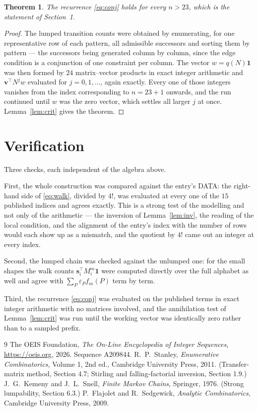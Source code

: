 \documentclass[11pt,a4paper]{article}
\theoremstyle{plain}
\newtheorem{theorem}{Theorem}
\theoremstyle{definition}
\begin{document}
\begin{theorem}
The recurrence \eqref{eq:conj} holds for every $n>23$, which is the statement of
Section~1.
\end{theorem}

\begin{proof}
The lumped transition counts were obtained by enumerating, for one representative row of
each pattern, all admissible successors and sorting them by pattern --- the successors being
generated column by column, since the edge condition is a conjunction of one constraint per
column. The vector $w=q(N)\mathbf{1}$ was then formed by $24$ matrix--vector products
in exact integer arithmetic and $\mathbf{v}^{\!\top}N^{j}w$ evaluated for
$j=0,1,\dots$, again exactly. Every one of those integers vanishes from the index
corresponding to $n=23+1$ onwards, and the run continued until $w$ was the zero vector,
which settles all larger $j$ at once. Lemma~\ref{lem:crit} gives the theorem.
\end{proof}

\section{Verification}

Three checks, each independent of the algebra above.

First, the whole construction was compared against the entry's DATA: the right-hand side of
\eqref{eq:walk}, divided by $4!$, was evaluated at every one of the $15$
published indices and agrees exactly. This is a strong test of the modelling and not only of
the arithmetic --- the inversion of Lemma~\ref{lem:inv}, the reading of the local
condition, and the alignment of the entry's index with the number of rows would each
show up as a mismatch, and the quotient by $4!$ came out an integer at every index.

Second, the lumped chain was checked against the unlumped one: for the small shapes the walk
counts $\mathbf{s}_i^{\!\top}M_i^{m}\mathbf{1}$ were computed directly over the full
alphabet as well and agree with $\sum_P\varepsilon_Pf_m(P)$ term by term.

Third, the recurrence \eqref{eq:conj} was evaluated on the published terms in exact integer
arithmetic with no matrices involved, and the annihilation test of Lemma~\ref{lem:crit} was
run until the working vector was identically zero rather than to a sampled prefix.

\begin{thebibliography}{9}
 The OEIS Foundation, \emph{The On-Line Encyclopedia of Integer
Sequences}, \url{https://oeis.org}, 2026. Sequence A209844.
 R.~P.~Stanley, \emph{Enumerative Combinatorics}, Volume 1, 2nd ed.,
Cambridge University Press, 2011. (Transfer-matrix method, Section 4.7; Stirling and
falling-factorial inversion, Section 1.9.)
 J.~G.~Kemeny and J.~L.~Snell, \emph{Finite Markov Chains}, Springer,
1976. (Strong lumpability, Section 6.3.)
 P.~Flajolet and R.~Sedgewick, \emph{Analytic Combinatorics}, Cambridge
University Press, 2009.
\end{thebibliography}
\end{document}
